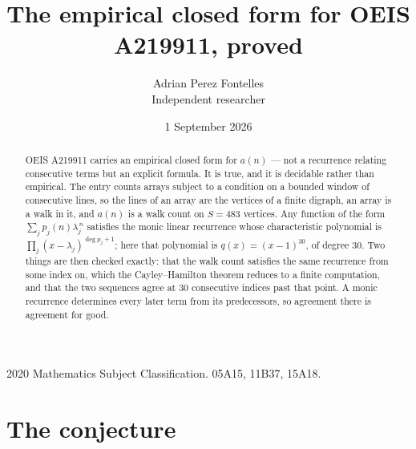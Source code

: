 \documentclass[11pt,a4paper]{article}
\title{The empirical closed form for OEIS A219911, proved}
\author{Adrian Perez Fontelles\\ \small Independent researcher}
\date{1 September 2026}
\theoremstyle{plain}
\theoremstyle{definition}
\begin{document}
\maketitle

\begin{abstract}
OEIS A219911 carries an empirical closed form for $a(n)$ --- not a recurrence relating
consecutive terms but an explicit formula. It is true, and it is decidable rather than
empirical. The entry counts arrays subject to a condition on a bounded window of consecutive lines, so the lines of an array are the
vertices of a finite digraph, an array is a walk in it, and $a(n)$ is a walk count on
$S=483$ vertices. Any function of the form $\sum_j p_j(n)\lambda_j^{\,n}$ satisfies the
monic linear recurrence whose characteristic polynomial is
$\prod_j(x-\lambda_j)^{\deg p_j+1}$; here that polynomial is $q(x)=(x-1)^{30}$, of degree
$30$. Two things are then checked exactly: that the walk count satisfies the same
recurrence from some index on, which the Cayley--Hamilton theorem reduces to a finite
computation, and that the two sequences agree at $30$ consecutive indices past that
point. A monic recurrence determines every later term from its predecessors, so agreement
there is agreement for good.
\end{abstract}

\noindent\small 2020 Mathematics Subject Classification. 05A15, 11B37, 15A18.\normalsize

\section{The conjecture}
\end{document}
